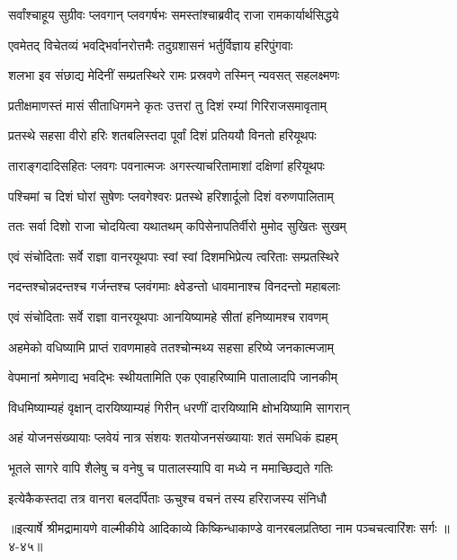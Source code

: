 
\twolineshloka
{सर्वांश्चाहूय सुग्रीवः प्लवगान् प्लवगर्षभः}
{समस्तांश्चाब्रवीद् राजा रामकार्यार्थसिद्धये} %

\twolineshloka
{एवमेतद् विचेतव्यं भवद्भिर्वानरोत्तमैः}
{तदुग्रशासनं भर्तुर्विज्ञाय हरिपुंगवाः} %

\twolineshloka
{शलभा इव संछाद्य मेदिनीं सम्प्रतस्थिरे}
{रामः प्रस्रवणे तस्मिन् न्यवसत् सहलक्ष्मणः} %

\twolineshloka
{प्रतीक्षमाणस्तं मासं सीताधिगमने कृतः}
{उत्तरां तु दिशं रम्यां गिरिराजसमावृताम्} %

\twolineshloka
{प्रतस्थे सहसा वीरो हरिः शतबलिस्तदा}
{पूर्वां दिशं प्रतिययौ विनतो हरियूथपः} %

\twolineshloka
{ताराङ्गदादिसहितः प्लवगः पवनात्मजः}
{अगस्त्याचरितामाशां दक्षिणां हरियूथपः} %

\twolineshloka
{पश्चिमां च दिशं घोरां सुषेणः प्लवगेश्वरः}
{प्रतस्थे हरिशार्दूलो दिशं वरुणपालिताम्} %

\twolineshloka
{ततः सर्वा दिशो राजा चोदयित्वा यथातथम्}
{कपिसेनापतिर्वीरो मुमोद सुखितः सुखम्} %

\twolineshloka
{एवं संचोदिताः सर्वे राज्ञा वानरयूथपाः}
{स्वां स्वां दिशमभिप्रेत्य त्वरिताः सम्प्रतस्थिरे} %

\twolineshloka
{नदन्तश्चोन्नदन्तश्च गर्जन्तश्च प्लवंगमाः}
{क्ष्वेडन्तो धावमानाश्च विनदन्तो महाबलाः} %

\twolineshloka
{एवं संचोदिताः सर्वे राज्ञा वानरयूथपाः}
{आनयिष्यामहे सीतां हनिष्यामश्च रावणम्} %

\twolineshloka
{अहमेको वधिष्यामि प्राप्तं रावणमाहवे}
{ततश्चोन्मथ्य सहसा हरिष्ये जनकात्मजाम्} %

\twolineshloka
{वेपमानां श्रमेणाद्य भवद्भिः स्थीयतामिति}
{एक एवाहरिष्यामि पातालादपि जानकीम्} %

\twolineshloka
{विधमिष्याम्यहं वृक्षान् दारयिष्याम्यहं गिरीन्}
{धरणीं दारयिष्यामि क्षोभयिष्यामि सागरान्} %

\twolineshloka
{अहं योजनसंख्यायाः प्लवेयं नात्र संशयः}
{शतयोजनसंख्यायाः शतं समधिकं ह्यहम्} %

\twolineshloka
{भूतले सागरे वापि शैलेषु च वनेषु च}
{पातालस्यापि वा मध्ये न ममाच्छिद्यते गतिः} %

\twolineshloka
{इत्येकैकस्तदा तत्र वानरा बलदर्पिताः}
{ऊचुश्च वचनं तस्य हरिराजस्य संनिधौ} %


॥इत्यार्षे श्रीमद्रामायणे वाल्मीकीये आदिकाव्ये किष्किन्धाकाण्डे वानरबलप्रतिष्ठा नाम पञ्चचत्वारिंशः सर्गः ॥४-४५॥
